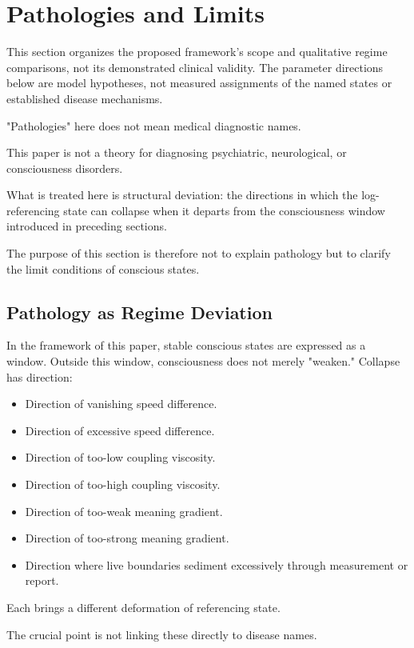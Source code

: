 \section{Pathologies and Limits}


This section organizes the proposed framework's scope and qualitative regime comparisons, not its demonstrated clinical validity. The parameter directions below are model hypotheses, not measured assignments of the named states or established disease mechanisms.

"Pathologies" here does not mean medical diagnostic names.

This paper is not a theory for diagnosing psychiatric, neurological, or consciousness disorders.

What is treated here is structural deviation: the directions in which the log-referencing state can collapse when it departs from the consciousness window introduced in preceding sections.

The purpose of this section is therefore not to explain pathology but to clarify the limit conditions of conscious states.

\subsection{Pathology as Regime Deviation}


In the framework of this paper, stable conscious states are expressed as a window. Outside this window, consciousness does not merely "weaken." Collapse has direction:

\begin{itemize}
\item Direction of vanishing speed difference.
\item Direction of excessive speed difference.
\item Direction of too-low coupling viscosity.
\item Direction of too-high coupling viscosity.
\item Direction of too-weak meaning gradient.
\item Direction of too-strong meaning gradient.
\item Direction where live boundaries sediment excessively through measurement or report.
\end{itemize}

Each brings a different deformation of referencing state.

The crucial point is not linking these directly to disease names.

